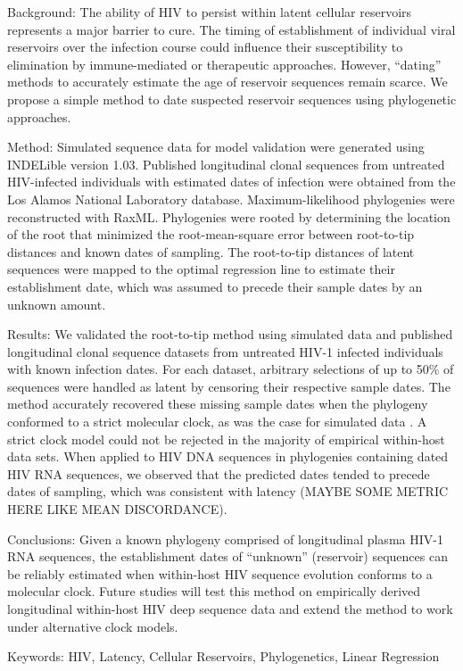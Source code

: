 Background: The ability of HIV to persist within latent cellular reservoirs represents a major barrier to cure. The timing of establishment of individual viral reservoirs over the infection course could influence their susceptibility to elimination by immune-mediated or therapeutic approaches. However, “dating” methods to accurately estimate the age of reservoir sequences remain scarce. We propose a simple method to date suspected reservoir sequences using phylogenetic approaches. 

Method: Simulated sequence data for model validation were generated using INDELible version 1.03.  Published longitudinal clonal sequences from untreated HIV-infected individuals with estimated dates of infection were obtained from the Los Alamos National Laboratory database. Maximum-likelihood phylogenies were reconstructed with RaxML. Phylogenies were rooted by determining the location of the root that minimized the root-mean-square error between root-to-tip distances and known dates of sampling. The root-to-tip distances of latent sequences were mapped to the optimal regression line to estimate their establishment date, which was assumed to precede their sample dates by an unknown amount.
 
Results: We validated the root-to-tip method using simulated data and published longitudinal clonal sequence datasets from untreated HIV-1 infected individuals with known infection dates. For each dataset, arbitrary selections of up to 50\% of sequences were handled as latent by censoring their respective sample dates.  The method accurately recovered these missing sample dates when the phylogeny conformed to a strict molecular clock, as was the case for simulated data . A strict clock model could not be rejected in the majority of empirical within-host data sets. When applied to HIV DNA sequences in phylogenies containing dated HIV RNA sequences, we observed that the predicted dates tended to precede dates of sampling, which was consistent with latency (MAYBE SOME METRIC HERE LIKE MEAN DISCORDANCE).

Conclusions:
Given a known phylogeny comprised of longitudinal plasma HIV-1 RNA sequences, the establishment dates of “unknown” (reservoir) sequences can be reliably estimated when within-host HIV sequence evolution conforms to a molecular clock. Future studies will test this method on empirically derived longitudinal within-host HIV deep sequence data and extend the method to work under alternative clock models.

Keywords: 
HIV, Latency, Cellular Reservoirs, Phylogenetics, Linear Regression

